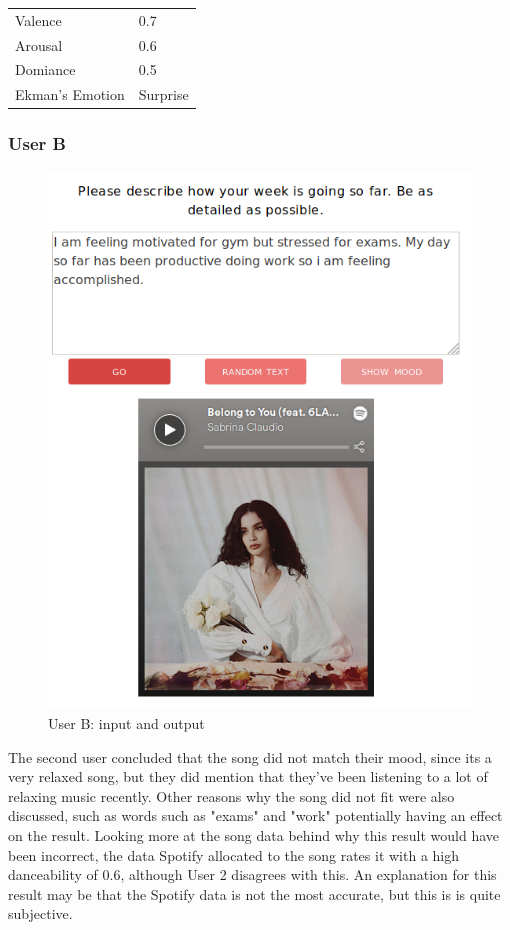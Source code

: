 \begin{table}[h]
\centering
\begin{tabular}{|l|l|}
\hline
 Valence &  0.7\\
 Arousal &  0.6\\
 Domiance &  0.5\\
 Ekman's Emotion &  Surprise\\ \hline
\end{tabular}
\end{table}

\subsubsection{User B}

\begin{figure}[h]
\centering
\includegraphics[scale=0.4]{implementation/jana.png}
\caption{User B: input and output}
\label{user:2}
\end{figure}

The second user concluded that the song did not match their mood, since its a very relaxed song, but they did mention that they've been listening to a lot of relaxing music recently. Other reasons why the song did not fit were also discussed, such as words such as "exams" and "work" potentially having an effect on the result. Looking more at the song data behind why this result would have been incorrect, the data Spotify allocated to the song rates it with a high danceability of 0.6, although User 2 disagrees with this. An explanation for this result may be that the Spotify data is not the most accurate, but this is is quite subjective.

